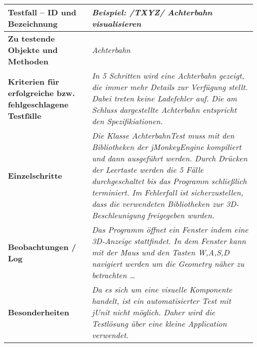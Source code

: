 
\begin{longtable}{|p{7cm}|p{10cm}|}
\hline
\textbf{Testfall -- ID und Bezeichnung} &  \textit{Beispiel:
                                                        /TXYZ/ Achterbahn visualisieren} \\
\hline
\textbf{Zu testende Objekte und Methoden} &  \textit{Achterbahn}
\\
\hline
\textbf{Kriterien für erfolgreiche bzw. fehlgeschlagene Testfälle} &
\textit{In 5 Schritten wird eine Achterbahn gezeigt, die immer mehr Details zur Verfügung stellt. Dabei treten keine Ladefehler auf. Die am Schluss dargestellte Achterbahn entspricht den Spezifikiationen. } \\
\hline
\textbf{Einzelschritte} &  \textit{ Die Klasse AchterbahnTest muss mit den Bibliotheken der jMonkeyEngine kompiliert und dann ausgeführt werden. Durch Drücken der Leertaste werden die 5 Fälle durchgeschaltet bis das 
Programm schließlich terminiert. Im Fehlerfall ist sicherzustellen, dass die verwendeten Bibliotheken zur 3D-Beschleunigung freigegeben wurden.
} \\
\hline
\textbf{Beobachtungen / Log} &  \textit{Das Programm öffnet ein Fenster indem eine 3D-Anzeige stattfindet. In dem Fenster kann mit der Maus und den Tasten W,A,S,D navigiert werden um die Geometry näher zu betrachten \ldots} \\
\hline
\textbf{Besonderheiten } &  \textit{Da es sich um eine visuelle Komponente handelt, ist ein automatisierter Test mit jUnit nicht möglich. Daher wird die Testlösung über eine kleine Application verwendet.} \\
\hline

 \end{longtable}






